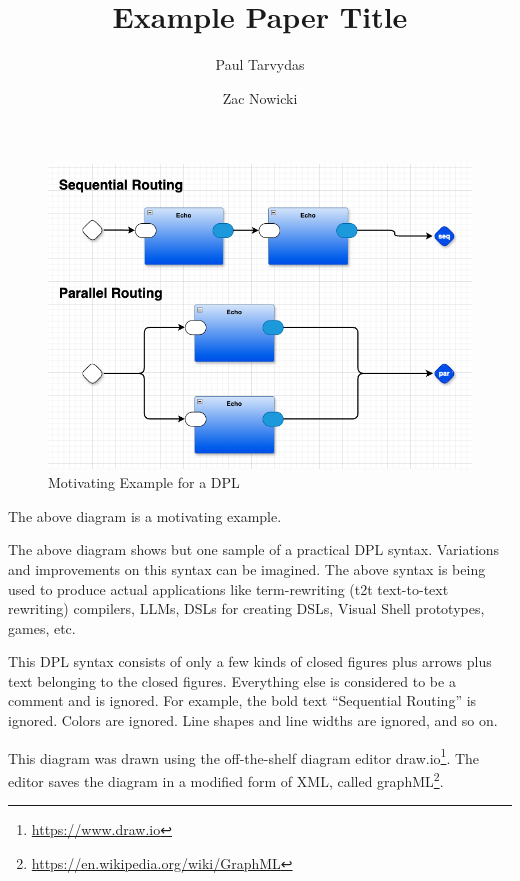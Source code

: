 \documentclass{acmart}
\title{Example Paper Title}
\author{Paul Tarvydas}
\affiliation{%
  \institution{retired}
  \city{Toronto}
  \state{Ontario}
  \country{Canada}
}
\author{Zac Nowicki}
\affiliation{%
  \institution{Kagi}
  \city{Palo Alto}
  \state{CA}
  \country{USA}
}
\begin{document}
\maketitle

\begin{figure}[h]
  \centering
  \includegraphics[width=0.5\linewidth]{HelloWorld0D.png}
  \caption{Motivating Example for a DPL}
  \label{fig:example}
\end{figure}

The above diagram is a motivating example.

The above diagram shows but one sample of a practical DPL syntax. Variations and improvements on this syntax can be imagined. The above syntax is being used to produce actual applications like term-rewriting (t2t text-to-text rewriting) compilers, LLMs, DSLs for creating DSLs, Visual Shell prototypes, games, etc.

This DPL syntax consists of only a few kinds of closed figures plus arrows plus text belonging to the closed figures. Everything else is considered to be a comment and is ignored. For example, the bold text “Sequential Routing” is ignored. Colors are ignored. Line shapes and line widths are ignored, and so on.

This diagram was drawn using the off-the-shelf diagram editor draw.io\footnote{\url{https://www.draw.io}}. The editor saves the diagram in a modified form of XML, called graphML\footnote{\url{https://en.wikipedia.org/wiki/GraphML}}.
\end{document}
